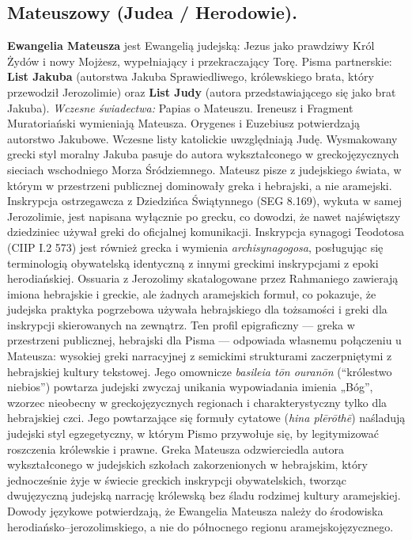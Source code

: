 \subsection{Mateuszowy (Judea / Herodowie).}
\textbf{Ewangelia Mateusza} jest Ewangelią judejską: Jezus jako prawdziwy Król Żydów i nowy Mojżesz, wypełniający i przekraczający Torę.
Pisma partnerskie: \textbf{List Jakuba} (autorstwa Jakuba Sprawiedliwego, królewskiego brata, który przewodził Jerozolimie) oraz \textbf{List Judy} (autora przedstawiającego się jako brat Jakuba).
\emph{Wczesne świadectwa:} Papias o Mateuszu.
Ireneusz i Fragment Muratoriański wymieniają Mateusza.
Orygenes i Euzebiusz potwierdzają autorstwo Jakubowe.
Wczesne listy katolickie uwzględniają Judę.
Wysmakowany grecki styl moralny Jakuba pasuje do autora wykształconego w greckojęzycznych sieciach wschodniego Morza Śródziemnego.
Mateusz pisze z judejskiego świata, w którym w przestrzeni publicznej dominowały greka i hebrajski, a nie aramejski.
Inskrypcja ostrzegawcza z Dziedzińca Świątynnego (SEG 8.169), wykuta w samej Jerozolimie, jest napisana wyłącznie po grecku, co dowodzi, że nawet najświętszy dziedziniec używał greki do oficjalnej komunikacji.
Inskrypcja synagogi Teodotosa (CIIP I.2 573) jest również grecka i wymienia \textit{archisynagogosa}, posługując się terminologią obywatelską identyczną z innymi greckimi inskrypcjami z epoki herodiańskiej.
Ossuaria z Jerozolimy skatalogowane przez Rahmaniego zawierają imiona hebrajskie i greckie, ale żadnych aramejskich formuł, co pokazuje, że judejska praktyka pogrzebowa używała hebrajskiego dla tożsamości i greki dla inskrypcji skierowanych na zewnątrz.
Ten profil epigraficzny — greka w przestrzeni publicznej, hebrajski dla Pisma — odpowiada własnemu połączeniu u Mateusza: wysokiej greki narracyjnej z semickimi strukturami zaczerpniętymi z hebrajskiej kultury tekstowej.
Jego omownicze \textit{basileia tōn ouranōn} (``królestwo niebios'') powtarza judejski zwyczaj unikania wypowiadania imienia „Bóg”, wzorzec nieobecny w greckojęzycznych regionach i charakterystyczny tylko dla hebrajskiej czci.
Jego powtarzające się formuły cytatowe (\textit{hina plērōthē}) naśladują judejski styl egzegetyczny, w którym Pismo przywołuje się, by legitymizować roszczenia królewskie i prawne.
Greka Mateusza odzwierciedla autora wykształconego w judejskich szkołach zakorzenionych w hebrajskim, który jednocześnie żyje w świecie greckich inskrypcji obywatelskich, tworząc dwujęzyczną judejską narrację królewską bez śladu rodzimej kultury aramejskiej.
Dowody językowe potwierdzają, że Ewangelia Mateusza należy do środowiska herodiańsko–jerozolimskiego, a nie do północnego regionu aramejskojęzycznego.

